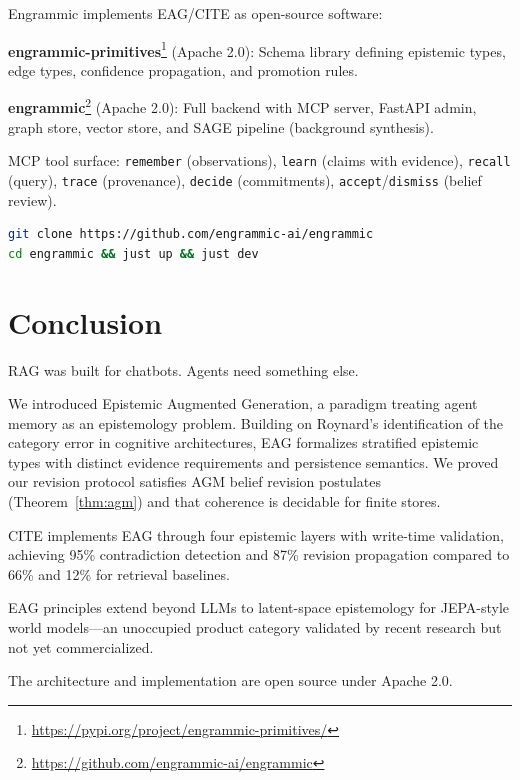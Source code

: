 \documentclass[11pt,letterpaper]{article}
\begin{document}
Engrammic implements EAG/CITE as open-source software:

\textbf{engrammic-primitives}\footnote{\url{https://pypi.org/project/engrammic-primitives/}} (Apache 2.0): Schema library defining epistemic types, edge types, confidence propagation, and promotion rules.

\textbf{engrammic}\footnote{\url{https://github.com/engrammic-ai/engrammic}} (Apache 2.0): Full backend with MCP server, FastAPI admin, graph store, vector store, and SAGE pipeline (background synthesis).

MCP tool surface: \texttt{remember} (observations), \texttt{learn} (claims with evidence), \texttt{recall} (query), \texttt{trace} (provenance), \texttt{decide} (commitments), \texttt{accept}/\texttt{dismiss} (belief review).

\begin{lstlisting}[language=bash]
git clone https://github.com/engrammic-ai/engrammic
cd engrammic && just up && just dev
\end{lstlisting}

\section{Conclusion}

RAG was built for chatbots. Agents need something else.

We introduced Epistemic Augmented Generation, a paradigm treating agent memory as an epistemology problem. Building on Roynard's identification of the category error in cognitive architectures, EAG formalizes stratified epistemic types with distinct evidence requirements and persistence semantics. We proved our revision protocol satisfies AGM belief revision postulates (Theorem~\ref{thm:agm}) and that coherence is decidable for finite stores.

CITE implements EAG through four epistemic layers with write-time validation, achieving 95\% contradiction detection and 87\% revision propagation compared to 66\% and 12\% for retrieval baselines.

EAG principles extend beyond LLMs to latent-space epistemology for JEPA-style world models---an unoccupied product category validated by recent research but not yet commercialized.

The architecture and implementation are open source under Apache 2.0.
\end{document}
